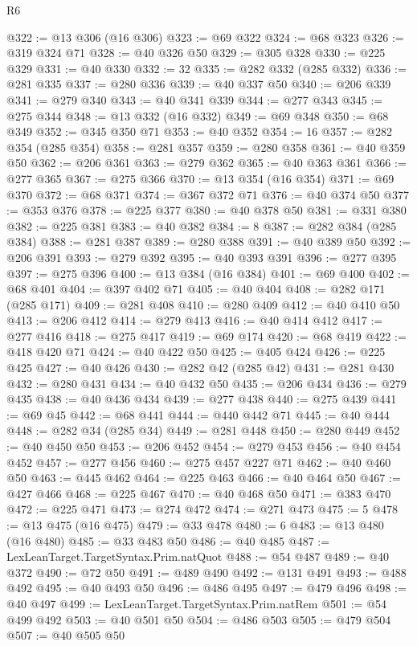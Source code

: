 \begin{lexlean}{R6}
\begin{coremodule}
@322 := @13 @306 (@16 @306)
@323 := @69 @322
@324 := @68 @323
@326 := @319 @324 @71
@328 := @40 @326 @50
@329 := @305 @328
@330 := @225 @329
@331 := @40 @330
@332 := 32
@335 := @282 @332 (@285 @332)
@336 := @281 @335
@337 := @280 @336
@339 := @40 @337 @50
@340 := @206 @339
@341 := @279 @340
@343 := @40 @341 @339
@344 := @277 @343
@345 := @275 @344
@348 := @13 @332 (@16 @332)
@349 := @69 @348
@350 := @68 @349
@352 := @345 @350 @71
@353 := @40 @352
@354 := 16
@357 := @282 @354 (@285 @354)
@358 := @281 @357
@359 := @280 @358
@361 := @40 @359 @50
@362 := @206 @361
@363 := @279 @362
@365 := @40 @363 @361
@366 := @277 @365
@367 := @275 @366
@370 := @13 @354 (@16 @354)
@371 := @69 @370
@372 := @68 @371
@374 := @367 @372 @71
@376 := @40 @374 @50
@377 := @353 @376
@378 := @225 @377
@380 := @40 @378 @50
@381 := @331 @380
@382 := @225 @381
@383 := @40 @382
@384 := 8
@387 := @282 @384 (@285 @384)
@388 := @281 @387
@389 := @280 @388
@391 := @40 @389 @50
@392 := @206 @391
@393 := @279 @392
@395 := @40 @393 @391
@396 := @277 @395
@397 := @275 @396
@400 := @13 @384 (@16 @384)
@401 := @69 @400
@402 := @68 @401
@404 := @397 @402 @71
@405 := @40 @404
@408 := @282 @171 (@285 @171)
@409 := @281 @408
@410 := @280 @409
@412 := @40 @410 @50
@413 := @206 @412
@414 := @279 @413
@416 := @40 @414 @412
@417 := @277 @416
@418 := @275 @417
@419 := @69 @174
@420 := @68 @419
@422 := @418 @420 @71
@424 := @40 @422 @50
@425 := @405 @424
@426 := @225 @425
@427 := @40 @426
@430 := @282 @42 (@285 @42)
@431 := @281 @430
@432 := @280 @431
@434 := @40 @432 @50
@435 := @206 @434
@436 := @279 @435
@438 := @40 @436 @434
@439 := @277 @438
@440 := @275 @439
@441 := @69 @45
@442 := @68 @441
@444 := @440 @442 @71
@445 := @40 @444
@448 := @282 @34 (@285 @34)
@449 := @281 @448
@450 := @280 @449
@452 := @40 @450 @50
@453 := @206 @452
@454 := @279 @453
@456 := @40 @454 @452
@457 := @277 @456
@460 := @275 @457 @227 @71
@462 := @40 @460 @50
@463 := @445 @462
@464 := @225 @463
@466 := @40 @464 @50
@467 := @427 @466
@468 := @225 @467
@470 := @40 @468 @50
@471 := @383 @470
@472 := @225 @471
@473 := @274 @472
@474 := @271 @473
@475 := 5
@478 := @13 @475 (@16 @475)
@479 := @33 @478
@480 := 6
@483 := @13 @480 (@16 @480)
@485 := @33 @483 @50
@486 := @40 @485
@487 := LexLeanTarget.TargetSyntax.Prim.natQuot
@488 := @54 @487
@489 := @40 @372
@490 := @72 @50
@491 := @489 @490
@492 := @131 @491
@493 := @488 @492
@495 := @40 @493 @50
@496 := @486 @495
@497 := @479 @496
@498 := @40 @497
@499 := LexLeanTarget.TargetSyntax.Prim.natRem
@501 := @54 @499 @492
@503 := @40 @501 @50
@504 := @486 @503
@505 := @479 @504
@507 := @40 @505 @50

\end{coremodule}
\end{lexlean}
